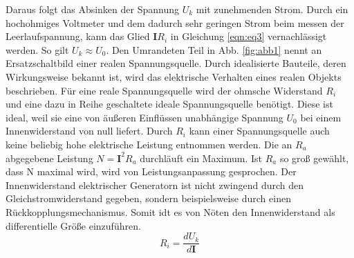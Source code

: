 Daraus folgt das Absinken der Spannung $U_k$ mit zunehmenden Strom.
Durch ein hochohmiges Voltmeter und dem dadurch sehr geringen Strom beim messen der Leerlaufspannung, kann das Glied $\symbf{I} R_i$ in Gleichung \ref{eqn:eq3} vernachlässigt werden.
So gilt $U_k \approx U_0$.
Den Umrandeten Teil in Abb. \ref{fig:abb1} nennt an Ersatzschaltbild einer realen Spannungsquelle.
Durch idealisierte Bauteile, deren Wirkungsweise bekannt ist, wird das elektrische Verhalten eines realen Objekts beschrieben.
Für eine reale Spannungsquelle wird der ohmsche Widerstand $R_i$ und eine dazu in Reihe geschaltete ideale Spannungsquelle benötigt.
Diese ist ideal, weil sie eine von äußeren Einflüssen unabhängige Spannung $U_0$ bei einem Innenwiderstand von null liefert.
Durch $R_i$ kann einer Spannungsquelle auch keine beliebig hohe elektrische Leistung entnommen werden.
Die an $R_a$ abgegebene Leistung $N = \symbf{I}^2 R_a$ durchläuft ein Maximum.
Ist $R_a$ so groß gewählt, dass N maximal wird, wird von Leistungsanpassung gesprochen.
Der Innenwiderstand elektrischer Generatorn ist nicht zwingend durch den Gleichstromwiderstand gegeben, sondern beispielsweise durch einen Rückkopplungsmechanismus.
Somit idt es von Nöten den Innenwiderstand als differentielle Größe einzuführen.
\begin{equation}
  R_i = \frac{dU_k}{d\symbf{I}}
\end{equation}